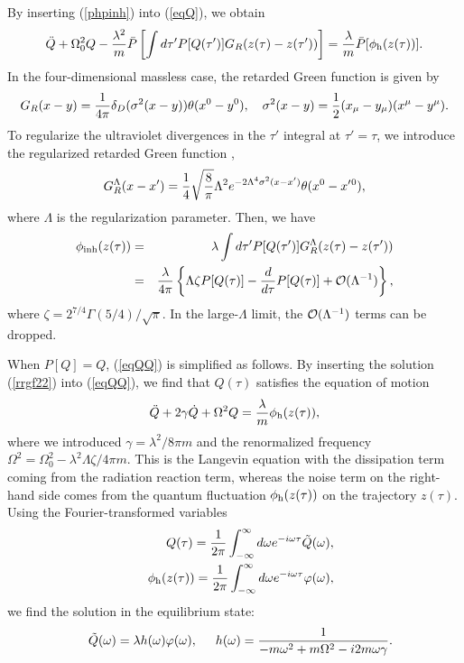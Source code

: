 \documentclass[aps,prd,preprintnumbers,nofootinbib,showpacs]{revtex4}%
\begin{document}
\begin{widetext}
By inserting (\ref{phpinh}) into (\ref{eqQ}), we obtain
\begin{eqnarray}
\ddot Q+\Omega^2_0 Q-{\lambda^2\over m}\bar P\left[
\int d\tau' P[Q(\tau')]G_R(z(\tau)-z(\tau'))\right]
={\lambda\over m}\bar P[\phi_{\rm h}(z(\tau))]. 
\label{eqQQ}
\end{eqnarray}
%
In the four-dimensional massless case, the retarded Green function is given by
\begin{eqnarray}
G_R(x-y)={1\over 4\pi}\delta_D(\sigma^2(x-y))\theta(x^0-y^0)
, ~~~\sigma^2(x-y)={1\over 2}(x_\mu-y_\mu)(x^\mu-y{}^\mu).
\end{eqnarray}
To regularize the ultraviolet divergences in the $\tau'$ integral at $\tau'=\tau$,
we introduce the regularized retarded Green function \cite{LH},
\begin{eqnarray}
G_R^\Lambda(x-x')={1\over 4}\sqrt{8\over\pi}\Lambda^2 e^{-2\Lambda^4\sigma^2(x-x')}\theta(x^0-x'{}^0),
\label{rrgf}
\end{eqnarray}
where $\Lambda$ is the regularization parameter. 
Then, we have
\begin{eqnarray}
\phi_{\rm inh}(z(\tau))&=&\lambda \int d\tau' P[Q(\tau')] G_R^\Lambda(z(\tau)-z(\tau'))
\nonumber\\
&=&{\lambda\over 4\pi}\left\{\Lambda\zeta P[Q(\tau)]-{d\over d\tau}P[Q(\tau)]+{\cal O}(\Lambda^{-1})\right\},
\label{rrgf22}
\end{eqnarray}
where $\zeta=2^{7/4}\Gamma(5/4)/\sqrt{\pi}$. In the large-$\Lambda$ limit, the ${\cal O}(\Lambda^{-1})$ terms
can be dropped.


When $P[Q]=Q$, (\ref{eqQQ}) is simplified as follows. 
By inserting the solution (\ref{rrgf22}) into (\ref{eqQQ}),
we find that $Q(\tau)$ satisfies the equation of motion
\begin{eqnarray}
\ddot Q+2\gamma \dot Q +\Omega^2 Q={\lambda\over m}\phi_{\rm h}(z(\tau)),
\end{eqnarray}
where we introduced $\gamma=\lambda^2/8\pi m$ and the renormalized frequency $\Omega^2
=\Omega_0^2-\lambda^2\Lambda\zeta/4\pi m$.
This is the Langevin equation with the dissipation term coming from the radiation reaction term,
whereas the noise term on the right-hand side comes from the quantum fluctuation $\phi_{\rm h}(z(\tau))$
on the trajectory $z(\tau)$. 
Using the Fourier-transformed variables 
\begin{eqnarray}
&&Q(\tau)={1\over2\pi}\int_{-\infty}^{\infty} d\omega e^{-i\omega\tau}\tilde Q(\omega),
\label{solQtau}
\\
&&\phi_{\rm h}(z(\tau))={1\over2\pi}\int_{-\infty}^{\infty} d\omega e^{-i\omega\tau}\varphi(\omega),
\label{solphih}
\end{eqnarray}
we find the solution in the equilibrium state:
\begin{eqnarray}
&&\tilde Q(\omega)=\lambda h(\omega) \varphi(\omega) , \hspace{5mm}
h(\omega)={1\over -m\omega^2+m\Omega^2-i2m{\omega\gamma}}. 
\label{solQ}
\end{eqnarray}


\end{widetext}
\end{document}
